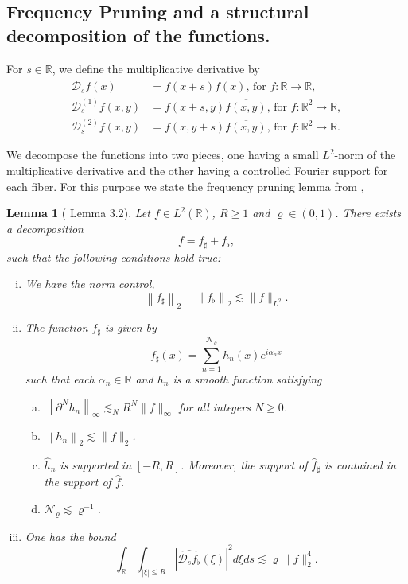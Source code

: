 \documentclass[a4paper,reqno]{amsart}
\newtheorem{lemma}[theorem]{Lemma}
\theoremstyle{definition}
\theoremstyle{remark}
\numberwithin{equation}{section}
\newcommand{\R}{{\mathbb {R}}}
\begin{document}
	\subsection{Frequency Pruning and a structural decomposition of the functions.}\label{sec:pruning} For $s\in\R$, we define the multiplicative derivative by
	\[
	\begin{aligned}
		\mathscr{D}_s f(x)&=f(x+s) \overline{f(x)} \text {, for } f:\R\to\R,\\
		\mathscr{D}^{(1)}_s f(x,y)&=f(x+s,y) \overline{f(x,y)} \text {, for } f:\R^2\to\R,\\
		\mathscr{D}^{(2)}_s f(x,y)&=f(x,y+s) \overline{f(x,y)} \text {, for } f:\R^2\to\R.
	\end{aligned}
	\]
	
	We decompose the functions into two pieces, one having a small $L^2$-norm of the multiplicative derivative and the other having a controlled Fourier support for each fiber. For this purpose we state the frequency pruning lemma from \cite{CDR},
	\begin{lemma}[\cite{CDR} Lemma 3.2]\label{multiplicativelemma}
		Let $f \in L^2(\mathbb{R})$, $R \geq 1$ and $\varrho \in(0,1)$. There exists a decomposition
		\[
		f=f_{\sharp}+f_\flat,
		\]
		such that the following conditions hold true:
		\begin{enumerate}[(i)]
			\item We have the norm control,
			\[
			\left\|f_{\sharp}\right\|_{2}+\left\|f_\flat\right\|_{2} \lesssim\|f\|_{L^2}.
			\]
			\item The function $f_{\sharp}$ is given by
			\[f_{\sharp}(x)=\sum_{n=1}^{\mathcal{N}_\varrho} h_n(x) e^{i \alpha_n x}\]
			such that each $\alpha_n \in \mathbb{R}$ and $h_n$ is a smooth function satisfying
			\begin{enumerate}[(a)]
				\item $\left\|\partial^N h_n\right\|_{\infty} \lesssim_N R^N\|f\|_{\infty}$ for all integers $N \geq 0$.
				\item $\left\|h_n\right\|_{2} \lesssim\|f\|_{2}$.
				\item $\widehat h_n$ is supported in $[-R, R]$. Moreover, the support of $\widehat{f}_{\sharp}$ is contained in the support of $\widehat{f}$.
				\item $\mathcal{N}_\varrho\lesssim \varrho^{-1}$.
			\end{enumerate}
			\item One has the bound
			\[
			\int_{\mathbb{R}} \int_{|\xi| \leq R}\left|\widehat{\mathscr{D}_s f_\flat}(\xi)\right|^2 d \xi d s \lesssim \varrho\|f\|_{2}^4 .
			\]	
		\end{enumerate}
	\end{lemma}
	
\end{document}
